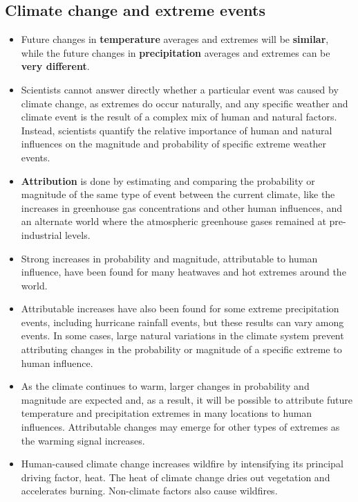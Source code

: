 \documentclass[11pt]{article}
\begin{document}
\newpage

\subsection{Climate change and extreme events}
\label{sec:orgc85f6d3}
\begin{itemize}
\item Future changes in \textbf{temperature} averages and extremes will be \textbf{similar}, while the future changes in \textbf{precipitation} averages and extremes can be \textbf{very different}.
\item Scientists cannot answer directly whether a particular event was caused by climate change, as extremes do occur naturally, and any specific weather and climate event is the result of a complex mix of human and natural factors. Instead, scientists quantify the relative importance of human and natural influences on the magnitude and probability of specific extreme weather events.
\item \textbf{Attribution} is done by estimating and comparing the probability or magnitude of the same type of event between the current climate, like the increases in greenhouse gas concentrations and other human influences, and an alternate world where the atmospheric greenhouse gases remained at pre-industrial levels.
\item Strong increases in probability and magnitude, attributable to human influence, have been found for many heatwaves and hot extremes around the world.
\item Attributable increases have also been found for some extreme precipitation events, including hurricane rainfall events, but these results can vary among events. In some cases, large natural variations in the climate system prevent attributing changes in the probability or magnitude of a specific extreme to human influence.
\item As the climate continues to warm, larger changes in probability and magnitude are expected and, as a result, it will be possible to attribute future temperature and precipitation extremes in many locations to human influences. Attributable changes may emerge for other types of extremes as the warming signal increases.
\item Human-caused climate change increases wildfire by intensifying its principal driving factor, heat. The heat of climate change dries out vegetation and accelerates burning. Non-climate factors also cause wildfires.
\end{itemize}
\end{document}
